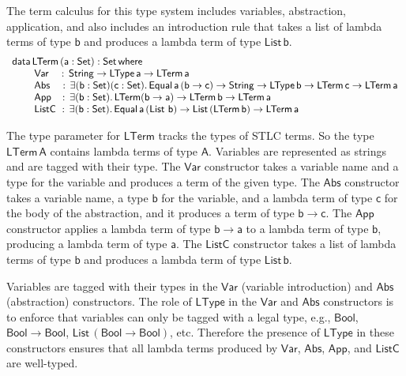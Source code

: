 \documentclass[acmsmall,screen,review,anonymous]{acmart}
\theoremstyle{definition}
\begin{document}
The term calculus for this type system includes variables, abstraction, application, 
and also includes an introduction rule that takes a list of lambda terms of type $\mathsf{b}$ and produces a lambda term of type $\mathsf{List\,b}$.
\begin{equation}\label{eq:eq_lterm}
\begin{array}{l}
\mathsf{data\, LTerm\,(a : Set) : Set\,where}\\
\mathsf{\;\;\;\;\;\;\;\;Var\,\,\,\,\,\,:\, String \to LType\,a \to LTerm\,a} \\
\mathsf{\;\;\;\;\;\;\;\;Abs\,\,\,\,\,\, :\, \exists (b : Set) (c : Set).\,Equal\,a\,(b \to c) \to String 
      \to LType\,b \to LTerm\,c \to LTerm\,a}\\
  \mathsf{\;\;\;\;\;\;\;\;App\,\,\,\,\, :\, \exists (b : Set).\,LTerm (b \to a) \to LTerm\,b \to LTerm\,a}\\
  \mathsf{\;\;\;\;\;\;\;\;ListC\,\, :\, \exists (b : Set).\,Equal\,a\,(\mathsf{List}\,\,b) \to List\,(LTerm\,b) \to LTerm\,a}
\end{array}
\end{equation}

The type parameter for $\mathsf{LTerm}$ tracks the types of STLC terms. So the type $\mathsf{LTerm\,A}$ 
contains lambda terms of type $\mathsf{A}$. 
Variables are represented as strings and are tagged with their type. 
The $\mathsf{Var}$ constructor takes a variable name and a type for the variable and produces 
a term of the given type. 
The $\mathsf{Abs}$ constructor takes a variable name, a type $\mathsf{b}$ for the variable,
and a lambda term of type $\mathsf{c}$ for the body of the abstraction, and 
it produces a term of type $\mathsf{b \to c}$. 
The $\mathsf{App}$ constructor applies a lambda term of type $\mathsf{b \to a}$ to a lambda term of type $\mathsf{b}$, producing
a lambda term of type $\mathsf{a}$. 
The $\mathsf{ListC}$ constructor takes a list of lambda terms of type $\mathsf{b}$ and produces a lambda term of type $\mathsf{List\,b}$.


Variables are tagged with their types in the $\mathsf{Var}$ (variable introduction) and 
$\mathsf{Abs}$ (abstraction) constructors. The role of $\mathsf{LType}$ in the $\mathsf{Var}$ and $\mathsf{Abs}$ constructors
is to enforce that variables can only be tagged with a legal type, e.g., $\mathsf{Bool}$, 
$\mathsf{Bool \to Bool}$, $\mathsf{List\, (Bool \to Bool)}$, etc. 
Therefore the presence of $\mathsf{LType}$ in these constructors ensures that all lambda terms produced by 
$\mathsf{Var}$, $\mathsf{Abs}$, $\mathsf{App}$, and $\mathsf{ListC}$ are well-typed. 
\end{document}
